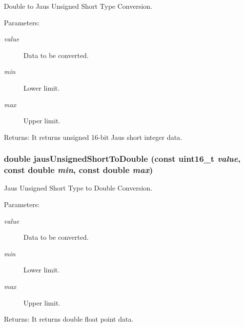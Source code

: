 Double to Jaus Unsigned Short Type Conversion. 

\begin{Desc}
\item[Parameters:]
\begin{description}
\item[{\em value}]Data to be converted. \item[{\em min}]Lower limit. \item[{\em max}]Upper limit.\end{description}
\end{Desc}
\begin{Desc}
\item[Returns:]It returns unsigned 16-bit Jaus short integer data. \end{Desc}
\hypertarget{group__data__conv_g1489cc4a07b435646434fe9874ecdb84}{
\subsubsection[jausUnsignedShortToDouble]{\setlength{\rightskip}{0pt plus 5cm}double jausUnsignedShortToDouble (const {\bf uint16\_\-t} {\em value}, \/  const double {\em min}, \/  const double {\em max})}}
\label{group__data__conv_g1489cc4a07b435646434fe9874ecdb84}


Jaus Unsigned Short Type to Double Conversion. 

\begin{Desc}
\item[Parameters:]
\begin{description}
\item[{\em value}]Data to be converted. \item[{\em min}]Lower limit. \item[{\em max}]Upper limit.\end{description}
\end{Desc}
\begin{Desc}
\item[Returns:]It returns double float point data. \end{Desc}
